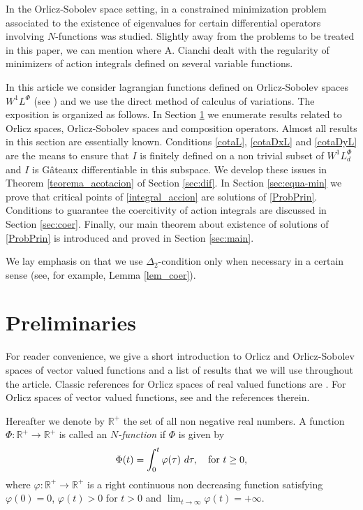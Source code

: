 \documentclass[twoside]{elsarticle}
\theoremstyle{remark}
\newcommand{\lphi}{L^{\Phi}}
\begin{document}
  In the Orlicz-Sobolev space setting, 
	in \cite{m-1999} a constrained minimization problem associated to the existence of eigenvalues for certain differential operators involving $N$-functions was studied.  
Slightly away from the problems to be treated in this paper, 
we can mention \cite{cianchi2000local, cianchi1999gradient} where A. Cianchi dealt with 
the regularity of minimizers of action integrals defined on several variable functions.

In this article  we consider lagrangian functions  defined on Orlicz-Sobolev spaces $W^{1}L^{\Phi}$    
(see \cite{adams_sobolev,KR, rao1991theory,2002applications}) 
and we use  the direct method of calculus of variations. 
The exposition is organized as follows. 
In Section \ref{preliminares} we enumerate results related to Orlicz spaces, Orlicz-Sobolev spaces and composition operators. 
Almost all results in this section  are essentially known. Conditions \eqref{cotaL}, \eqref{cotaDxL} and \eqref{cotaDyL} are the means to ensure that $I$ is finitely defined on 
a non trivial subset of $W^{1}\lphi_d$ and $I$ is G\^ateaux differentiable in this subspace. 
We develop 
these issues in Theorem \ref{teorema_acotacion}  of Section \ref{sec:dif}. In Section \ref{sec:equa-min} we prove that critical points of \eqref{integral_accion}
 are solutions of \eqref{ProbPrin}. Conditions to guarantee the coercitivity of action integrals are discussed in Section \ref{sec:coer}. Finally, our main theorem about existence of solutions of  \eqref{ProbPrin} is introduced and proved in Section \ref{sec:main}. 

We lay emphasis on that we use $\Delta_2$-condition only when 
necessary in a certain sense (see, for example, Lemma \ref{lem_coer}).
   




\section{Preliminaries}\label{preliminares}


For reader convenience, we give a short introduction to Orlicz and Orlicz-Sobolev spaces of vector valued functions and a  list  of results that we will use throughout the article. 
Classic references for Orlicz spaces of real valued functions are \cite{adams_sobolev,KR,rao1991theory}.
For  Orlicz spaces of vector valued functions, see \cite{Orliczvectorial2005} and the references therein.

Hereafter we denote  by $\mathbb{R}^+$  the set of all non negative real numbers. A function $\Phi:\mathbb{R}^+\to \mathbb{R}^+ $ is called an \emph{$N$-function} if $\Phi$ is given by 
\[
\Phi(t)=\int_{0}^t \varphi(\tau)\ d\tau,\quad\hbox{for } t\geq 0,
\]
where $\varphi:\mathbb{R}^+\rightarrow \mathbb{R}^+$ is a right continuous non decreasing function  satisfying   $\varphi(0)=0$, $\varphi(t)>0$ for $t>0$ and
$\lim_{t\rightarrow \infty}\varphi(t)=+\infty$.
\end{document}
